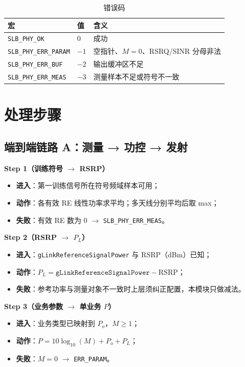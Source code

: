 \documentclass[11pt,a4paper]{ctexart}
\begin{document}
\begin{longtable}{L{4cm}L{2cm}L{8cm}}
\caption{错误码\label{tab:6545-err}} \\
\toprule
\textbf{宏} & \textbf{值} & \textbf{含义} \\
\midrule
\texttt{SLB\_PHY\_OK} & 0 & 成功 \\
\texttt{SLB\_PHY\_ERR\_PARAM} & $-1$ & 空指针、$M{=}0$、RSRQ/SINR 分母非法 \\
\texttt{SLB\_PHY\_ERR\_BUF} & $-2$ & 输出缓冲区不足 \\
\texttt{SLB\_PHY\_ERR\_MEAS} & $-3$ & 测量样本不足或符号不一致 \\
\bottomrule
\end{longtable}

\section{处理步骤}

\subsection{端到端链路 A：测量 → 功控 → 发射}

\textbf{Step 1（训练符号 $\rightarrow$ RSRP）}
\begin{itemize}[nosep]
  \item \textbf{进入}：第一训练信号所在符号频域样本可用；
  \item \textbf{动作}：各有效 RE 线性功率求平均；多天线分别平均后取 max；
  \item \textbf{失败}：有效 RE 数为 0 $\rightarrow$ \texttt{SLB\_PHY\_ERR\_MEAS}。
\end{itemize}

\textbf{Step 2（RSRP $\rightarrow$ $P_L$）}
\begin{itemize}[nosep]
  \item \textbf{进入}：\texttt{gLinkReferenceSignalPower} 与 RSRP（dBm）已知；
  \item \textbf{动作}：$P_L=\texttt{gLinkReferenceSignalPower}-\mathrm{RSRP}$；
  \item \textbf{失败}：参考功率与测量对象不一致时上层须纠正配置，本模块只做减法。
\end{itemize}

\textbf{Step 3（业务参数 $\rightarrow$ 单业务 $P$）}
\begin{itemize}[nosep]
  \item \textbf{进入}：业务类型已映射到 $P_o$，$M\geq 1$；
  \item \textbf{动作}：$P=10\log_{10}(M)+P_o+P_L$；
  \item \textbf{失败}：$M{=}0$ $\rightarrow$ \texttt{ERR\_PARAM}。
\end{itemize}
\end{document}
